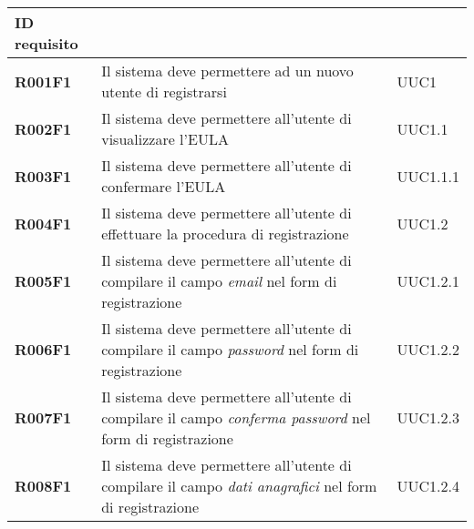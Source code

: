 \documentclass[../analisi-dei-requisiti.tex]{subfiles}
\begin{document}
\centering
{}
\renewcommand{\arraystretch}{2} %
\begin{longtable}[H]{>{\centering\bfseries}m{3cm} >{\centering}m{10cm} >{\centering\arraybackslash}m{3cm}}
  \rowcolor{darkgray!90!}
  \color{white}
  {\textbf{ID requisito}} & \color{white}{\textbf{Descrizione}}                                                                                                            & \color{white}{\textbf{Fonte}} \\
  \endhead
  \rowcolor{white}
  \multicolumn{3}{r}{\textit{Continua alla pagina seguente}}
  \endfoot
  \endlastfoot
  R001F1                  & Il sistema deve permettere ad un nuovo utente di registrarsi                                                                                   & UUC1                          \\
  R002F1                  & Il sistema deve permettere all'utente di visualizzare l'EULA                                                                                   & UUC1.1                        \\
  R003F1                  & Il sistema deve permettere all'utente di confermare l'EULA                                                                                     & UUC1.1.1                      \\
  R004F1                  & Il sistema deve permettere all'utente di effettuare la procedura di registrazione                                                              & UUC1.2                        \\
  R005F1                  & Il sistema deve permettere all'utente di compilare il campo \textit{email} nel form di registrazione                                           & UUC1.2.1                      \\
  R006F1                  & Il sistema deve permettere all'utente di compilare il campo \textit{password} nel form di registrazione                                        & UUC1.2.2                      \\
  R007F1                  & Il sistema deve permettere all'utente di compilare il campo \textit{conferma password} nel form di registrazione                               & UUC1.2.3                      \\
  R008F1                  & Il sistema deve permettere all'utente di compilare il campo \textit{dati anagrafici} nel form di registrazione                                 & UUC1.2.4                      \\

\end{longtable}
\end{document}
